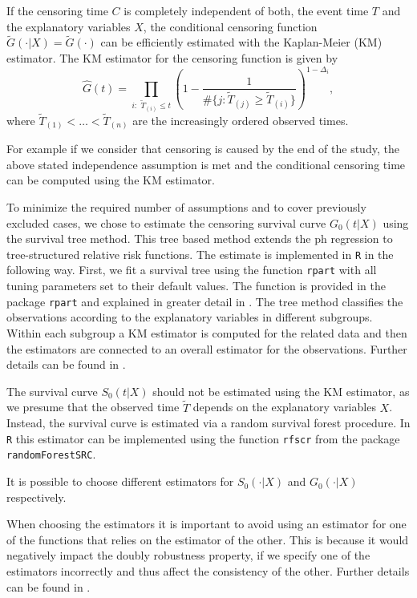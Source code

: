 \documentclass[12pt, a4paper]{scrartcl}
\theoremstyle{definition}
\theoremstyle{plain}
\numberwithin{equation}{section}
\numberwithin{figure}{section}
\numberwithin{table}{section}
\begin{document}
	If the censoring time $C$ is completely independent of both, the event time $T$ and the explanatory variables $X$, the conditional censoring function $\tilde{G}(\cdot\vert X)=\tilde{G}(\cdot)$ can be efficiently estimated with the Kaplan-Meier (KM) estimator.
	The KM estimator for the censoring function is given by
	\begin{equation*}
		\hat{G}(t) = \prod_{i:\text{~} \tilde T_{(i)} \leq t} \left(1-\frac{1}{\#\{j: \tilde T_{(j)} \geq\tilde T_{(i)} \}}\right)^{1-\Delta_i},
	\end{equation*}
	where $\tilde T_{(1)}<\dots<\tilde T_{(n)}$ are the increasingly ordered observed times.
	
	For example if we consider that censoring is caused by the end of the study, the above stated independence assumption is met and the conditional censoring time can be computed using the KM estimator.
	
	To minimize the required number of assumptions and to cover previously excluded cases, we chose to estimate the censoring survival curve $G_0(t \vert X)$ using the survival tree method.
	This tree based method extends the ph regression to tree-structured relative risk functions.
	The estimate is implemented in \texttt{R} in the following way.
	First, we fit a survival tree using the function \texttt{rpart} with all tuning parameters set to their default values.
	The function is provided in the package \texttt{rpart} and explained in greater detail in \citet*{rpart}.
	The tree method classifies the observations according to the explanatory variables in different subgroups.
	Within each subgroup a KM estimator is computed for the related data and then the estimators are connected to an overall estimator for the observations. %
	Further details can be found in \citet*{relativerisktrees}.
	
	The survival curve $S_0(t\vert X)$ should not be estimated using the KM estimator, as we presume that the observed time $\tilde T$ depends on the explanatory variables $X$.
	Instead, the survival curve is estimated via a random survival forest procedure.
	In \texttt{R} this estimator can be implemented using the function \texttt{rfscr} from the package \texttt{randomForestSRC}. 
	
	It is possible to choose different estimators for $S_0(\cdot\vert X)$ and $G_0(\cdot\vert X)$ respectively.
	
	When choosing the estimators it is important to avoid using an estimator for one of the functions that relies on the estimator of the other.
	This is because it would negatively impact the doubly robustness property, if we specify one of the estimators incorrectly and thus affect the consistency of the other.
	Further details can be found in \citet*{drtrees}.
	
\end{document}
